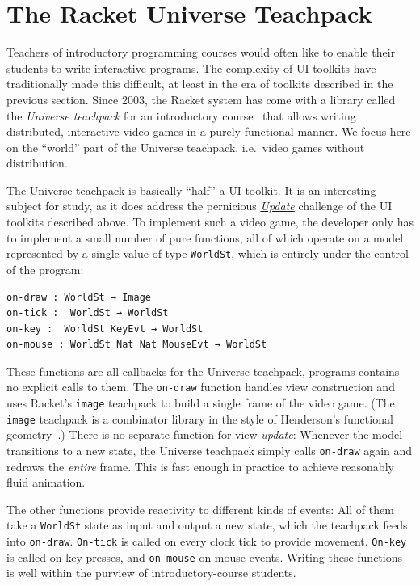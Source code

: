 \documentclass[sigplan,screen]{acmart}
\begin{document}
\section{The Racket Universe Teachpack}
\label{sec:universe-teachpack}

Teachers of introductory programming courses would often like to
enable their students to write interactive programs.  The complexity
of UI toolkits have traditionally made this difficult, at least in the
era of toolkits described in the previous section.  Since 2003, the Racket system
 has come with a library called the \textit{Universe teachpack} for an
introductory course~\cite{UniverseTeachpack} that allows writing
distributed, interactive video games in a purely functional manner.
We focus
here on the ``world'' part of the Universe teachpack, i.e.\ video
games without distribution.

The Universe teachpack is basically ``half'' a UI toolkit.  It is an
interesting subject for study, as it does address the pernicious \hyperlink{challenge:update}{\textit{Update}}
challenge of the UI toolkits described above.  To implement such a video game, the
developer only has to implement a small number of pure functions, all
of which operate on a model represented by
a single value of type \texttt{WorldSt}, which is entirely under the
control of the program:
%
\begin{verbatim}
on-draw : WorldSt → Image
on-tick :  WorldSt → WorldSt
on-key :  WorldSt KeyEvt → WorldSt
on-mouse : WorldSt Nat Nat MouseEvt → WorldSt
\end{verbatim}
%
These functions are all callbacks for the Universe teachpack, 
programs contains no explicit calls to them.
The \texttt{on-draw} function handles view construction and uses Racket's
\texttt{image} teachpack to build a single frame of the video game.
(The \texttt{image} teachpack is a combinator library in the style of
Henderson's functional geometry~\cite{Henderson1982}.)  There is no
separate function for view \emph{update}: Whenever the model
transitions to a new state, the Universe teachpack simply calls
\texttt{on-draw} again and redraws the \emph{entire} frame.  This is
fast enough in practice to achieve reasonably fluid animation.

The other functions provide reactivity to different kinds of events:
All of them take a \texttt{WorldSt} state as input and output a new
state, which the teachpack feeds into \texttt{on-draw}.
\texttt{On-tick} is called on every clock tick to provide movement.
\texttt{On-key} is called on
key presses, and \texttt{on-mouse} on mouse events.  Writing these
functions is well within the purview of introductory-course students.
\end{document}
